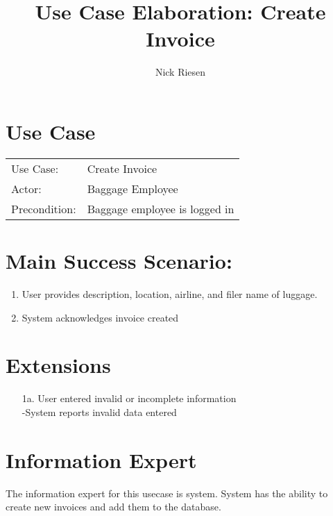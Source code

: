 \documentclass{article}
\title{Use Case Elaboration: Create Invoice}
\author{ Nick Riesen }
\begin{document}
\maketitle


\section*{Use Case}
\begin{tabular}{l l}
Use Case:     & Create Invoice                \\
Actor:        & Baggage Employee              \\
Precondition: & Baggage employee is logged in \\
\end{tabular}


\section*{Main Success Scenario:}

\begin{enumerate}
    \item  User provides description, location, airline, and filer name of luggage. 
    \item System acknowledges invoice created

\end{enumerate}

\section*{Extensions}

\begin{itemize}
    \item [1a.] User entered invalid or incomplete information \\
        -System reports invalid data entered
                            
\end{itemize}

\section*{Information Expert}

The information expert for this usecase is system. System has the ability to create new invoices and add them to the database.
\end{document}
